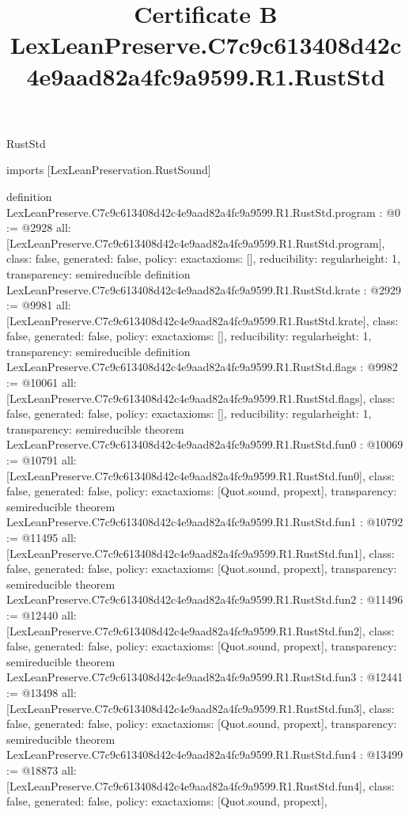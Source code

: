 \begin{lexlean}{RustStd}
\title{Certificate B LexLeanPreserve.C7c9c613408d42c4e9aad82a4fc9a9599.R1.RustStd}
\begin{coremodule}
imports [LexLeanPreservation.RustSound]

definition LexLeanPreserve.C7c9c613408d42c4e9aad82a4fc9a9599.R1.RustStd.program : @0 := @2928 {
  all: [LexLeanPreserve.C7c9c613408d42c4e9aad82a4fc9a9599.R1.RustStd.program],
  class: false,
  generated: false,
  policy: exact{axioms: []},
  reducibility: regular{height: 1},
  transparency: semireducible
}
definition LexLeanPreserve.C7c9c613408d42c4e9aad82a4fc9a9599.R1.RustStd.krate : @2929 := @9981 {
  all: [LexLeanPreserve.C7c9c613408d42c4e9aad82a4fc9a9599.R1.RustStd.krate],
  class: false,
  generated: false,
  policy: exact{axioms: []},
  reducibility: regular{height: 1},
  transparency: semireducible
}
definition LexLeanPreserve.C7c9c613408d42c4e9aad82a4fc9a9599.R1.RustStd.flags : @9982 := @10061 {
  all: [LexLeanPreserve.C7c9c613408d42c4e9aad82a4fc9a9599.R1.RustStd.flags],
  class: false,
  generated: false,
  policy: exact{axioms: []},
  reducibility: regular{height: 1},
  transparency: semireducible
}
theorem LexLeanPreserve.C7c9c613408d42c4e9aad82a4fc9a9599.R1.RustStd.fun0 : @10069 := @10791 {
  all: [LexLeanPreserve.C7c9c613408d42c4e9aad82a4fc9a9599.R1.RustStd.fun0],
  class: false,
  generated: false,
  policy: exact{axioms: [Quot.sound, propext]},
  transparency: semireducible
}
theorem LexLeanPreserve.C7c9c613408d42c4e9aad82a4fc9a9599.R1.RustStd.fun1 : @10792 := @11495 {
  all: [LexLeanPreserve.C7c9c613408d42c4e9aad82a4fc9a9599.R1.RustStd.fun1],
  class: false,
  generated: false,
  policy: exact{axioms: [Quot.sound, propext]},
  transparency: semireducible
}
theorem LexLeanPreserve.C7c9c613408d42c4e9aad82a4fc9a9599.R1.RustStd.fun2 : @11496 := @12440 {
  all: [LexLeanPreserve.C7c9c613408d42c4e9aad82a4fc9a9599.R1.RustStd.fun2],
  class: false,
  generated: false,
  policy: exact{axioms: [Quot.sound, propext]},
  transparency: semireducible
}
theorem LexLeanPreserve.C7c9c613408d42c4e9aad82a4fc9a9599.R1.RustStd.fun3 : @12441 := @13498 {
  all: [LexLeanPreserve.C7c9c613408d42c4e9aad82a4fc9a9599.R1.RustStd.fun3],
  class: false,
  generated: false,
  policy: exact{axioms: [Quot.sound, propext]},
  transparency: semireducible
}
theorem LexLeanPreserve.C7c9c613408d42c4e9aad82a4fc9a9599.R1.RustStd.fun4 : @13499 := @18873 {
  all: [LexLeanPreserve.C7c9c613408d42c4e9aad82a4fc9a9599.R1.RustStd.fun4],
  class: false,
  generated: false,
  policy: exact{axioms: [Quot.sound, propext]},
}
\end{coremodule}
\end{lexlean}
